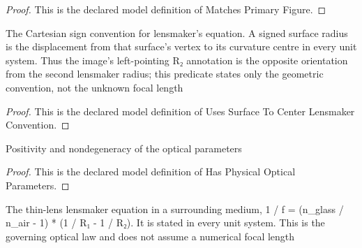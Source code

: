 \begin{proof}
  This is the declared model definition of Matches Primary Figure.
\end{proof}
\begin{definition}
  \label{def:physics:phyx-mini-0133:phyxminiproblems-problemphyxmini0133-usessurfacetocenterlensmakerconvention}
  The Cartesian sign convention for lensmaker's equation. A signed surface radius is the displacement from that surface's vertex to its curvature centre in every unit system. Thus the image's left-pointing R₂ annotation is the opposite orientation from the second lensmaker radius; this predicate states only the geometric convention, not the unknown focal length
\end{definition}
\begin{proof}
  This is the declared model definition of Uses Surface To Center Lensmaker Convention.
\end{proof}
\begin{definition}
  \label{def:physics:phyx-mini-0133:phyxminiproblems-problemphyxmini0133-hasphysicalopticalparameters}
  Positivity and nondegeneracy of the optical parameters
\end{definition}
\begin{proof}
  This is the declared model definition of Has Physical Optical Parameters.
\end{proof}
\begin{definition}
  \label{def:physics:phyx-mini-0133:phyxminiproblems-problemphyxmini0133-obeysthinlenslensmakerequation}
  The thin-lens lensmaker equation in a surrounding medium, 1 / f = (n\_glass / n\_air - 1) * (1 / R₁ - 1 / R₂). It is stated in every unit system. This is the governing optical law and does not assume a numerical focal length
\end{definition}
